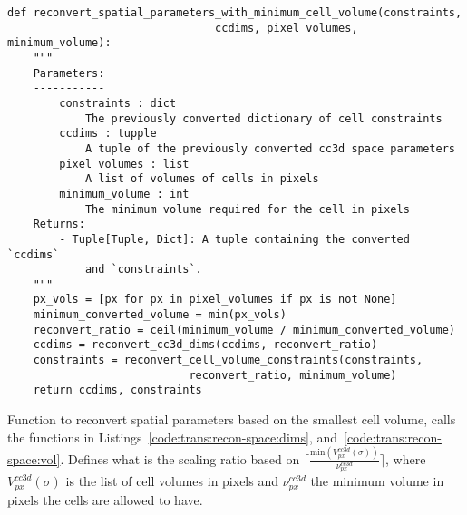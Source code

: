 

\begin{listing}[H]%
\begin{verbatim}
def reconvert_spatial_parameters_with_minimum_cell_volume(constraints, 
                                ccdims, pixel_volumes, minimum_volume):
    """
    Parameters:
    -----------
        constraints : dict
            The previously converted dictionary of cell constraints
        ccdims : tupple
            A tuple of the previously converted cc3d space parameters
        pixel_volumes : list
            A list of volumes of cells in pixels
        minimum_volume : int
            The minimum volume required for the cell in pixels
    Returns:
        - Tuple[Tuple, Dict]: A tuple containing the converted `ccdims` 
            and `constraints`.
    """
    px_vols = [px for px in pixel_volumes if px is not None]
    minimum_converted_volume = min(px_vols)
    reconvert_ratio = ceil(minimum_volume / minimum_converted_volume)
    ccdims = reconvert_cc3d_dims(ccdims, reconvert_ratio)
    constraints = reconvert_cell_volume_constraints(constraints, 
                            reconvert_ratio, minimum_volume)
    return ccdims, constraints
\end{verbatim}
\caption{Function to reconvert spatial parameters based on the smallest cell volume, calls the functions in Listings~\ref{code:trans:recon-space:dims}, and~\ref{code:trans:recon-space:vol}. Defines what is the scaling ratio based on $\lceil\frac{\text{min}(V^{cc3d}_{px}(\sigma))}{\nu^{cc3d}_{px}}\rceil$, where $V^{cc3d}_{px}(\sigma)$ is the list of cell volumes in pixels and $\nu^{cc3d}_{px}$ the minimum volume in pixels the cells are allowed to have.}\label{code:trans:recon-space}
\end{listing}



